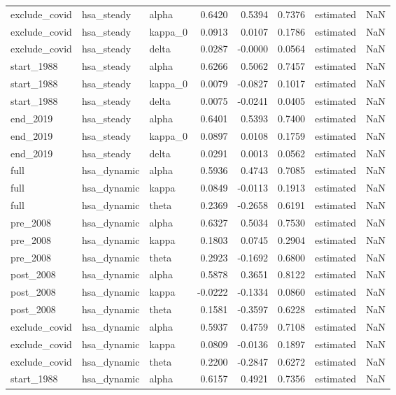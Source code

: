 \begin{tabular}{lllrrrlr}
exclude\_covid & hsa\_steady & alpha & 0.6420 & 0.5394 & 0.7376 & estimated & NaN \\
exclude\_covid & hsa\_steady & kappa\_0 & 0.0913 & 0.0107 & 0.1786 & estimated & NaN \\
exclude\_covid & hsa\_steady & delta & 0.0287 & -0.0000 & 0.0564 & estimated & NaN \\
start\_1988 & hsa\_steady & alpha & 0.6266 & 0.5062 & 0.7457 & estimated & NaN \\
start\_1988 & hsa\_steady & kappa\_0 & 0.0079 & -0.0827 & 0.1017 & estimated & NaN \\
start\_1988 & hsa\_steady & delta & 0.0075 & -0.0241 & 0.0405 & estimated & NaN \\
end\_2019 & hsa\_steady & alpha & 0.6401 & 0.5393 & 0.7400 & estimated & NaN \\
end\_2019 & hsa\_steady & kappa\_0 & 0.0897 & 0.0108 & 0.1759 & estimated & NaN \\
end\_2019 & hsa\_steady & delta & 0.0291 & 0.0013 & 0.0562 & estimated & NaN \\
full & hsa\_dynamic & alpha & 0.5936 & 0.4743 & 0.7085 & estimated & NaN \\
full & hsa\_dynamic & kappa & 0.0849 & -0.0113 & 0.1913 & estimated & NaN \\
full & hsa\_dynamic & theta & 0.2369 & -0.2658 & 0.6191 & estimated & NaN \\
pre\_2008 & hsa\_dynamic & alpha & 0.6327 & 0.5034 & 0.7530 & estimated & NaN \\
pre\_2008 & hsa\_dynamic & kappa & 0.1803 & 0.0745 & 0.2904 & estimated & NaN \\
pre\_2008 & hsa\_dynamic & theta & 0.2923 & -0.1692 & 0.6800 & estimated & NaN \\
post\_2008 & hsa\_dynamic & alpha & 0.5878 & 0.3651 & 0.8122 & estimated & NaN \\
post\_2008 & hsa\_dynamic & kappa & -0.0222 & -0.1334 & 0.0860 & estimated & NaN \\
post\_2008 & hsa\_dynamic & theta & 0.1581 & -0.3597 & 0.6228 & estimated & NaN \\
exclude\_covid & hsa\_dynamic & alpha & 0.5937 & 0.4759 & 0.7108 & estimated & NaN \\
exclude\_covid & hsa\_dynamic & kappa & 0.0809 & -0.0136 & 0.1897 & estimated & NaN \\
exclude\_covid & hsa\_dynamic & theta & 0.2200 & -0.2847 & 0.6272 & estimated & NaN \\
start\_1988 & hsa\_dynamic & alpha & 0.6157 & 0.4921 & 0.7356 & estimated & NaN \\

\end{tabular}
